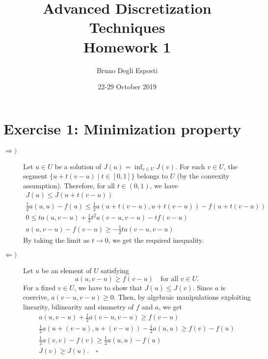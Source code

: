 \documentclass[a4paper]{article}
\title{\huge{Advanced Discretization Techniques \\
Homework 1}}
\author{\Large{Bruno Degli Esposti}}
\date{22-29 October 2019}
\begin{document}
\maketitle

\section*{Exercise 1: Minimization property}
\begin{description}
\item[$\Rightarrow)$]
Let $u \in U$ be a solution of $J(u) = \inf_{v \in U} J(v)$.
For each $v \in U$, the segment $\{u + t(v-u) \mid t \in [0,1]\}$
belongs to $U$ (by the convexity assumption).
Therefore, for all $t \in (0,1)$, we have
\begin{gather*}
J(u) \leq J(u + t(v-u)) \\
\frac{1}{2}a(u,u) - f(u) \leq \frac{1}{2}a(u+t(v-u),u+t(v-u)) - f(u+t(v-u)) \\
0 \leq t a(u,v-u) + \frac{1}{2} t^2 a(v-u,v-u) - t f(v-u) \\
a(u,v-u) - f(v-u) \geq -\frac{1}{2} t a(v-u,v-u)
\end{gather*}
By taking the limit as $t \to 0$, we get the required inequality.
\item[$\Leftarrow)$]
Let $u$ be an element of $U$ satisfying
\[
a(u,v-u) \geq f(v-u) \quad \text{for all $v \in U$.}
\]
For a fixed $v \in U$, we have to show that $J(u) \leq J(v)$.
Since $a$ is coercive, $a(v-u,v-u) \geq 0$.
Then, by algebraic manipulations exploiting linearity, bilinearity and simmetry
of $f$ and $a$, we get
\begin{gather*}
a(u,v-u) + \frac{1}{2} a(v-u,v-u) \geq f(v-u) \\
\frac{1}{2} a(u+(v-u),u+(v-u)) - \frac{1}{2} a(u,u) \geq f(v) - f(u) \\
\frac{1}{2} a(v,v) - f(v) \geq \frac{1}{2} a(u,u) - f(u) \\
J(v) \geq J(u). \quad \square
\end{gather*}
\end{description}
\end{document}
